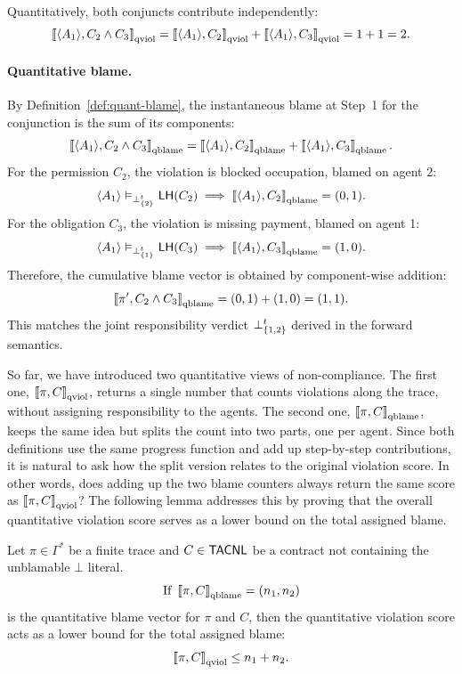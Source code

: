 \begin{example}
  Quantitatively, both conjuncts contribute independently:
  \[
  \left\llbracket \langle A_1 \rangle , C_2 \wedge C_3 \right\rrbracket_{\text{qviol}}
  = \left\llbracket \langle A_1 \rangle , C_2 \right\rrbracket_{\text{qviol}} + \left\llbracket \langle A_1 \rangle , C_3 \right\rrbracket_{\text{qviol}}
  = 1 + 1 = 2.
  \]


  \paragraph{Quantitative blame.}
  By Definition~\ref{def:quant-blame}, the instantaneous blame at Step~1 for the conjunction is the sum of its components:
  \[
  \left\llbracket \langle A_1 \rangle , C_2 \wedge C_3 \right\rrbracket_{\text{qblame}} 
  = \left\llbracket \langle A_1 \rangle , C_2 \right\rrbracket_{\text{qblame}} + \left\llbracket \langle A_1 \rangle , C_3 \right\rrbracket_{\text{qblame}}.
  \]
  For the permission $C_2$, the violation is blocked occupation, blamed on agent 2:
  \[
  \langle A_1 \rangle  \vDash_{\mathbin{\bot^{t}_{\{2\}}}} \mathsf{LH}(C_2) \implies \left\llbracket \langle A_1 \rangle , C_2 \right\rrbracket_{\text{qblame}} = (0,1).
  \]
  For the obligation $C_3$, the violation is missing payment, blamed on agent 1:
  \[
  \langle A_1 \rangle  \vDash_{\mathbin{\bot^{t}_{\{1\}}}} \mathsf{LH}(C_3) \implies \left\llbracket \langle A_1 \rangle , C_3 \right\rrbracket_{\text{qblame}} = (1,0).
  \]
  Therefore, the cumulative blame vector is obtained by component-wise addition:
  \[
  \left\llbracket \pi', C_2 \wedge C_3 \right\rrbracket_{\text{qblame}}
  = (0,1) + (1,0)
  = (1,1).
  \]
  This matches the joint responsibility verdict $\mathbin{\bot^{t}_{\{1,2\}}}$ derived in the forward semantics.
  \end{example}

So far, we have introduced two quantitative views of non-compliance. The first one, $\left\llbracket \pi,C \right\rrbracket_{\text{qviol}}$, returns a single number that counts violations along the trace, without assigning responsibility to the agents. The second one, $\left\llbracket \pi,C \right\rrbracket_{\text{qblame}}$, keeps the same idea but splits the count into two parts, one per agent. Since both definitions use the same progress function and add up step-by-step contributions, it is natural to ask how the split version relates to the original violation score. In other words, does adding up the two blame counters always return the same score as $\left\llbracket \pi,C \right\rrbracket_{\text{qviol}}$? The following lemma addresses this by proving that the overall quantitative violation score serves as a lower bound on the total assigned blame.


    \begin{lemma}
        \label{lem:qsem-qblame-decomp}
        Let $\pi \in \Gamma^*$ be a finite trace and $C \in \mathsf{TACNL}$ be a contract not containing the unblamable $\bot$ literal.
        \[ \text{If }
        \left\llbracket \pi,C \right\rrbracket_{\text{qblame}} = (n_1,n_2)
        \]
        is the quantitative blame vector for $\pi$ and $C$,
        then the quantitative violation score acts as a lower bound for the total assigned blame:
        \[
        \left\llbracket \pi,C \right\rrbracket_{\text{qviol}} \le n_1 + n_2.
        \]
        \end{lemma}

